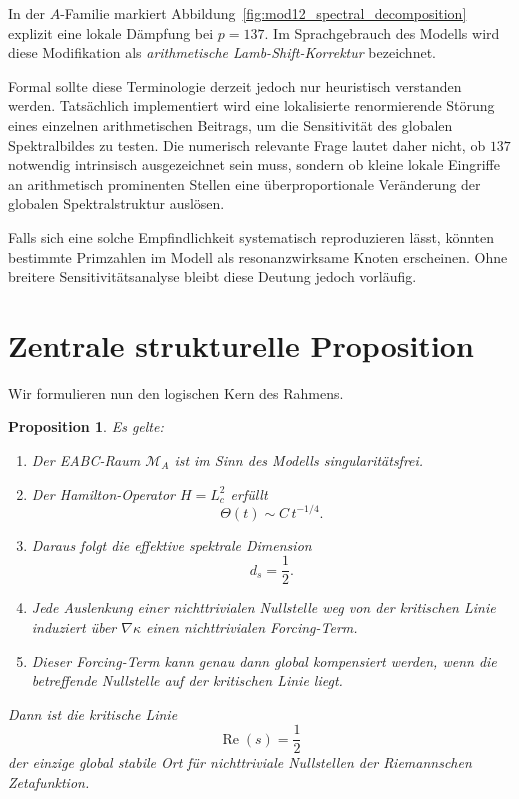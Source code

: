 \documentclass[11pt,a4paper]{amsart}
\theoremstyle{plain}
\newtheorem{proposition}[satz]{Proposition}
\theoremstyle{definition}
\theoremstyle{remark}
\newcommand{\RePart}{\operatorname{Re}}
\newcommand{\grad}{\nabla}
\newcommand{\MA}{\mathcal{M}_A}
\newcommand{\ThetaH}{\Theta}
\newcommand{\kappaF}{\kappa}
\newcommand{\Lc}{L_c}
\begin{document}
	In der \(A\)-Familie markiert Abbildung~\ref{fig:mod12_spectral_decomposition} explizit eine lokale Dämpfung bei \(p=137\). Im Sprachgebrauch des Modells wird diese Modifikation als \emph{arithmetische Lamb-Shift-Korrektur} bezeichnet.
	
	Formal sollte diese Terminologie derzeit jedoch nur heuristisch verstanden werden. Tatsächlich implementiert wird eine lokalisierte renormierende Störung eines einzelnen arithmetischen Beitrags, um die Sensitivität des globalen Spektralbildes zu testen. Die numerisch relevante Frage lautet daher nicht, ob \(137\) notwendig intrinsisch ausgezeichnet sein muss, sondern ob kleine lokale Eingriffe an arithmetisch prominenten Stellen eine überproportionale Veränderung der globalen Spektralstruktur auslösen.
	
	Falls sich eine solche Empfindlichkeit systematisch reproduzieren lässt, könnten bestimmte Primzahlen im Modell als resonanzwirksame Knoten erscheinen. Ohne breitere Sensitivitätsanalyse bleibt diese Deutung jedoch vorläufig.
	
	\section{Zentrale strukturelle Proposition}
	
	Wir formulieren nun den logischen Kern des Rahmens.
	
	\begin{proposition}
		Es gelte:
		\begin{enumerate}[label=(\roman*)]
			\item Der EABC-Raum \(\MA\) ist im Sinn des Modells singularitätsfrei.
			\item Der Hamilton-Operator \(H=\Lc^2\) erfüllt
			\[
			\ThetaH(t)\sim C\,t^{-1/4}.
			\]
			\item Daraus folgt die effektive spektrale Dimension
			\[
			d_s=\frac12.
			\]
			\item Jede Auslenkung einer nichttrivialen Nullstelle weg von der kritischen Linie induziert über \(\grad\kappaF\) einen nichttrivialen Forcing-Term.
			\item Dieser Forcing-Term kann genau dann global kompensiert werden, wenn die betreffende Nullstelle auf der kritischen Linie liegt.
		\end{enumerate}
		Dann ist die kritische Linie
		\[
		\RePart(s)=\frac12
		\]
		der einzige global stabile Ort für nichttriviale Nullstellen der Riemannschen Zetafunktion.
	\end{proposition}
	
\end{document}
